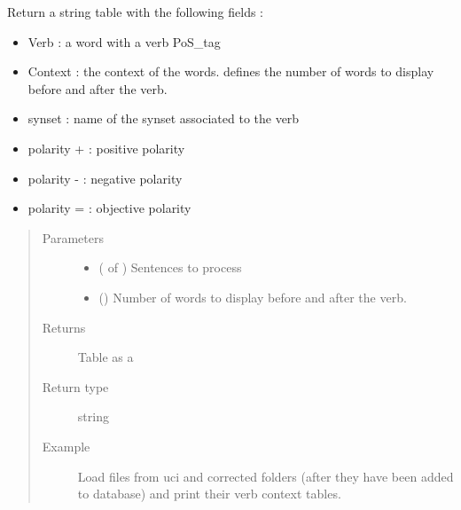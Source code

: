 \documentclass[letterpaper,10pt,english]{sphinxmanual}
\begin{document}
\begin{fulllineitems}
\label{\detokenize{analysis:loacore.analysis.pattern_recognition.verb_context_table}}
Return a string table with the following fields :
\begin{itemize}
\item {} 
Verb : a word with a verb PoS\_tag

\item {} 
Context : the context of the words.  defines the number of words to display before and after
the verb.

\item {} 
synset : name of the synset associated to the verb

\item {} 
polarity + : positive polarity

\item {} 
polarity - : negative polarity

\item {} 
polarity = : objective polarity

\end{itemize}
\begin{quote}\begin{description}
\item[{Parameters}] \leavevmode\begin{itemize}
\item {} 
 ( of {\hyperref[\detokenize{classes:loacore.classes.classes.Sentence}]{}}) \textendash{} Sentences to process

\item {} 
 () \textendash{} Number of words to display before and after the verb.

\end{itemize}

\item[{Returns}] \leavevmode
Table as a 

\item[{Return type}] \leavevmode
string

\item[{Example}] \leavevmode
Load files from uci and corrected folders (after they have been added to database) and print their verb context
tables.


\end{description}
\end{quote}
\end{fulllineitems}
\end{document}
